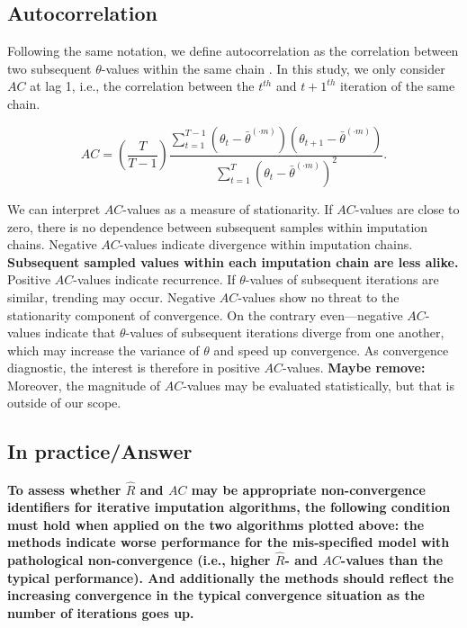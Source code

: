 \documentclass[Royal,times,sageh]{sagej}
\begin{document}
\hypertarget{autocorrelation}{%
\subsection{Autocorrelation}\label{autocorrelation}}

Following the same notation, we define autocorrelation as the
correlation between two subsequent \(\theta\)-values within the same
chain \citep[p.~147]{lync07}. In this study, we only consider \(AC\) at
lag 1, i.e., the correlation between the \(t^{th}\) and \(t+1^{th}\)
iteration of the same chain.

\begin{equation*}
AC = \left( \frac{T}{T-1} \right) \frac{\sum_{t=1}^{T-1}(\theta_t - \bar{\theta}^{(\cdot m)})(\theta_{t+1} - \bar{\theta}^{(\cdot m)})}{\sum_{t=1}^{T}(\theta_t - \bar{\theta}^{(\cdot m)})^2}.
\end{equation*}

We can interpret \(AC\)-values as a measure of stationarity. If
\(AC\)-values are close to zero, there is no dependence between
subsequent samples within imputation chains. Negative \(AC\)-values
indicate divergence within imputation chains. \textbf{Subsequent sampled
values within each imputation chain are less alike.} Positive
\(AC\)-values indicate recurrence. If \(\theta\)-values of subsequent
iterations are similar, trending may occur. Negative \(AC\)-values show
no threat to the stationarity component of convergence. On the contrary
even---negative \(AC\)-values indicate that \(\theta\)-values of
subsequent iterations diverge from one another, which may increase the
variance of \(\theta\) and speed up convergence. As convergence
diagnostic, the interest is therefore in positive \(AC\)-values.
\textbf{Maybe remove:} Moreover, the magnitude of \(AC\)-values may be
evaluated statistically, but that is outside of our scope.

\hypertarget{in-practiceanswer}{%
\subsection{In practice/Answer}\label{in-practiceanswer}}

\textbf{To assess whether \(\widehat{R}\) and \(AC\) may be appropriate
non-convergence identifiers for iterative imputation algorithms, the
following condition must hold when applied on the two algorithms plotted
above: the methods indicate worse performance for the mis-specified
model with pathological non-convergence (i.e., higher \(\widehat{R}\)-
and \(AC\)-values than the typical performance). And additionally the
methods should reflect the increasing convergence in the typical
convergence situation as the number of iterations goes up.}
\end{document}
